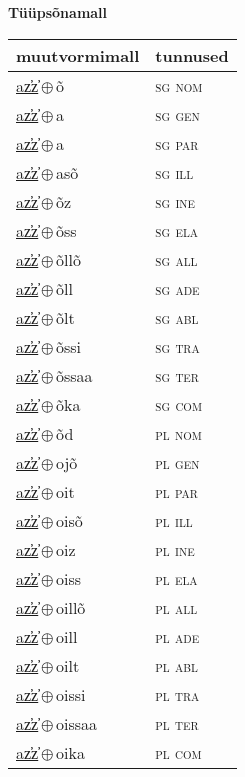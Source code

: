 

\vspace{3.5em}
\noindent \begin{minipage}{\textwidth}
\noindent \textbf{Tüüpsõnamall \,}\\

\begin{sideways}
\begin{tabular}{l l}
muutvormimall & tunnused \\
\hline
\underline{az̕z̕}\,$\oplus$\,õ & \textsc{ sg nom } \\
\underline{az̕z̕}\,$\oplus$\,a & \textsc{ sg gen } \\
\underline{az̕z̕}\,$\oplus$\,a & \textsc{ sg par } \\
\underline{az̕z̕}\,$\oplus$\,asõ & \textsc{ sg ill } \\
\underline{az̕z̕}\,$\oplus$\,õz & \textsc{ sg ine } \\
\underline{az̕z̕}\,$\oplus$\,õss & \textsc{ sg ela } \\
\underline{az̕z̕}\,$\oplus$\,õllõ & \textsc{ sg all } \\
\underline{az̕z̕}\,$\oplus$\,õll & \textsc{ sg ade } \\
\underline{az̕z̕}\,$\oplus$\,õlt & \textsc{ sg abl } \\
\underline{az̕z̕}\,$\oplus$\,õssi & \textsc{ sg tra } \\
\underline{az̕z̕}\,$\oplus$\,õssaa & \textsc{ sg ter } \\
\underline{az̕z̕}\,$\oplus$\,õka & \textsc{ sg com } \\
\underline{az̕z̕}\,$\oplus$\,õd & \textsc{ pl nom } \\
\underline{az̕z̕}\,$\oplus$\,ojõ & \textsc{ pl gen } \\
\underline{az̕z̕}\,$\oplus$\,oit & \textsc{ pl par } \\
\underline{az̕z̕}\,$\oplus$\,oisõ & \textsc{ pl ill } \\
\underline{az̕z̕}\,$\oplus$\,oiz & \textsc{ pl ine } \\
\underline{az̕z̕}\,$\oplus$\,oiss & \textsc{ pl ela } \\
\underline{az̕z̕}\,$\oplus$\,oillõ & \textsc{ pl all } \\
\underline{az̕z̕}\,$\oplus$\,oill & \textsc{ pl ade } \\
\underline{az̕z̕}\,$\oplus$\,oilt & \textsc{ pl abl } \\
\underline{az̕z̕}\,$\oplus$\,oissi & \textsc{ pl tra } \\
\underline{az̕z̕}\,$\oplus$\,oissaa & \textsc{ pl ter } \\
\underline{az̕z̕}\,$\oplus$\,oika & \textsc{ pl com } \\
\end{tabular}
\end{sideways}
\label{tab:tüüpsõnamall-az̕z̕õ}

\end{minipage}

